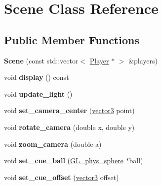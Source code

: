\hypertarget{class_scene}{
\section{Scene Class Reference}
\label{class_scene}
}
\subsection*{Public Member Functions}
\begin{DoxyCompactItemize}
\item 
\hypertarget{class_scene_a3e26b3ed8d98a61e73495a05a7a9d69b}{
{\bfseries Scene} (const std::vector$<$ \hyperlink{class_player}{Player} $\ast$ $>$ \&players)}
\label{class_scene_a3e26b3ed8d98a61e73495a05a7a9d69b}

\item 
\hypertarget{class_scene_afc739ece3abd0e8b66c858e1887f16b2}{
void {\bfseries display} () const }
\label{class_scene_afc739ece3abd0e8b66c858e1887f16b2}

\item 
\hypertarget{class_scene_a1fbd4ff7262917ef45118c7db0e296c1}{
void {\bfseries update\_\-light} ()}
\label{class_scene_a1fbd4ff7262917ef45118c7db0e296c1}

\item 
\hypertarget{class_scene_a63a87fb042b903bec9e0a4a0fbc0141a}{
void {\bfseries set\_\-camera\_\-center} (\hyperlink{classvector3d}{vector3} point)}
\label{class_scene_a63a87fb042b903bec9e0a4a0fbc0141a}

\item 
\hypertarget{class_scene_a8422f6f372ae78a3b5317d03a6e690d3}{
void {\bfseries rotate\_\-camera} (double x, double y)}
\label{class_scene_a8422f6f372ae78a3b5317d03a6e690d3}

\item 
\hypertarget{class_scene_ad584f37410ca39e1da34da90bafb8990}{
void {\bfseries zoom\_\-camera} (double a)}
\label{class_scene_ad584f37410ca39e1da34da90bafb8990}

\item 
\hypertarget{class_scene_ada1e619e6df8f72ae5e8bcbde0714187}{
void {\bfseries set\_\-cue\_\-ball} (\hyperlink{class_g_l__phys__sphere}{GL\_\-phys\_\-sphere} $\ast$ball)}
\label{class_scene_ada1e619e6df8f72ae5e8bcbde0714187}

\item 
\hypertarget{class_scene_ac349ad96d81aec1df32eb73cf2139504}{
void {\bfseries set\_\-cue\_\-offset} (\hyperlink{classvector3d}{vector3} offset)}
\label{class_scene_ac349ad96d81aec1df32eb73cf2139504}


\end{DoxyCompactItemize}
